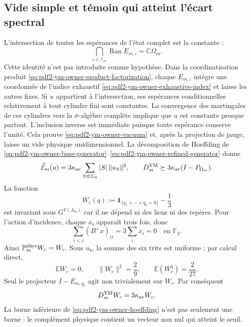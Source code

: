 \subsection{Vide simple et témoin qui atteint l'écart spectral}

L'intersection de toutes les espérances de l'état complet est la constante :
\begin{equation}\label{eq:pdf2-ym-owner-vacuum}
 \bigcap_{\iota\in\mathcal I_m}\operatorname{Ran}E_{m,\iota}
 =\mathbb C\Omega_m.
\end{equation}
Cette identité n'est pas introduite comme hypothèse. Dans la coordinatisation produit \eqref{eq:pdf2-ym-owner-product-factorization}, chaque $E_{m,\iota}$ intègre une coordonnée de l'indice exhaustif \eqref{eq:pdf2-ym-owner-exhaustive-index} et laisse les autres fixes. Si $u$ appartient à l'intersection, ses espérances conditionnelles relativement à tout cylindre fini sont constantes. La convergence des martingales de ces cylindres vers la $\sigma$-algèbre complète implique que $u$ est constante presque partout. L'inclusion inverse est immédiate puisque toute espérance conserve l'unité. Cela prouve \eqref{eq:pdf2-ym-owner-vacuum} et, après la projection de jauge, laisse un vide physique unidimensionnel. La décomposition de Hoeffding de \eqref{eq:pdf2-ym-owner-base-generator}--\eqref{eq:pdf2-ym-owner-refined-generator} donne
\begin{equation}\label{eq:pdf2-ym-owner-hoeffding}
 \widehat{\mathcal E}_m(u)
 =3\kappa_{\rm av}\sum_{S\Subset\mathcal I_m}|S|\,\|u_S\|^2,
 \qquad
 D_m^{\rm YM}\succeq
 3\kappa_{\rm av}(I-P_{\Omega_m}).
\end{equation}
La fonction
\begin{equation}\label{eq:pdf2-ym-owner-wc}
 W_c(q):=\mathbf1_{\{q_1+\cdots+q_6=0\}}-\frac13
\end{equation}
est invariant sous $G^{V(\Lambda_m)}$ car il ne dépend ni des liens ni des repères. Pour
l’action d’incidence, chaque $x_i$ apparaît trois fois, donc
\begin{equation}\label{eq:pdf2-ym-owner-wc-invariance}
 \sum_{i<j}(B^+x)_{ij}=3\sum_i x_i=0
 \quad\text{en }\mathbb F_3.
\end{equation}
Ainsi $\mathbb P_m^{\rm phys}W_c=W_c$. Sous $u_6$, la somme des six trits est
uniforme ; par calcul direct,
\begin{equation}\label{eq:pdf2-ym-owner-wc-moments}
 \mathbb EW_c=0,\qquad
 \|W_c\|^2=\frac29,\qquad
 \mathbb E(W_c^3)=\frac2{27}.
\end{equation}
Seul le projecteur $I-E_{m,q_c}$ agit non trivialement sur $W_c$. Par conséquent
\begin{equation}\label{eq:pdf2-ym-owner-wc-eigenvalue}
 D_m^{\rm YM}W_c=3\kappa_{\rm av}W_c.
\end{equation}
La borne inférieure de \eqref{eq:pdf2-ym-owner-hoeffding} n’est pas seulement une borne : le
complément physique contient un vecteur non nul qui atteint le seuil.

